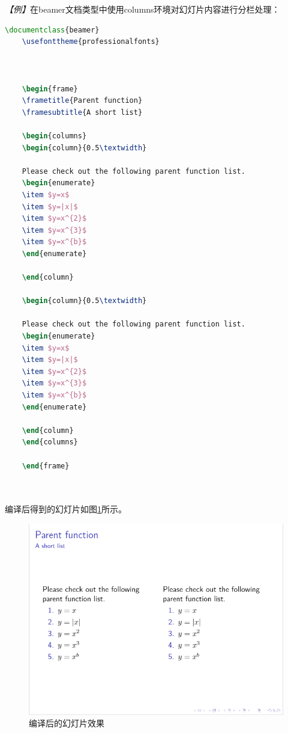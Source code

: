 \emph{【例】}在beamer文档类型中使用columns环境对幻灯片内容进行分栏处理：
\begin{lstlisting}[language=TeX]
    \documentclass{beamer}
    \usefonttheme{professionalfonts}

    

    \begin{frame}
    \frametitle{Parent function}
    \framesubtitle{A short list}

    \begin{columns}
    \begin{column}{0.5\textwidth}

    Please check out the following parent function list.
    \begin{enumerate}
    \item $y=x$
    \item $y=|x|$
    \item $y=x^{2}$
    \item $y=x^{3}$
    \item $y=x^{b}$
    \end{enumerate}

    \end{column}

    \begin{column}{0.5\textwidth}

    Please check out the following parent function list.
    \begin{enumerate}
    \item $y=x$
    \item $y=|x|$
    \item $y=x^{2}$
    \item $y=x^{3}$
    \item $y=x^{b}$
    \end{enumerate}

    \end{column}
    \end{columns}

    \end{frame}

    
\end{lstlisting}

编译后得到的幻灯片如图\ref{fig:911}所示。

\begin{figure}[htbp]
    \centering
    \includegraphics[width = 0.6\linewidth]{images/ch_9/example_two_column.png}
    \caption{编译后的幻灯片效果}
    \label{fig:911}
\end{figure}

